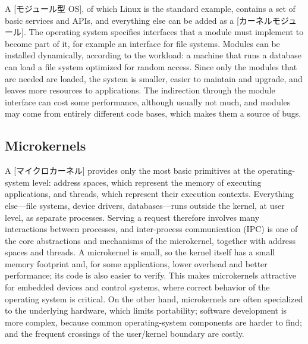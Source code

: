 \documentclass[../main.tex]{subfiles}
\begin{document}
A [モジュール型 OS], of which Linux is the
standard example, contains a set of basic services and APIs, and
everything else can be added as a
[カーネルモジュール].
The operating system specifies interfaces that a module must implement to
become part of it, for example an interface for file systems.  Modules can
be installed dynamically, according to the workload: a machine that runs a
database can load a file system optimized for random access.  Since only
the modules that are needed are loaded, the system is smaller, easier to
maintain and upgrade, and leaves more resources to applications.  The
indirection through the module interface can cost some performance,
although usually not much, and modules may come from entirely different
code bases, which makes them a source of bugs.


\subsection{Microkernels}

A [マイクロカーネル] provides only the most basic
primitives at the operating-system level: address spaces, which represent
the memory of executing applications, and threads, which represent their
execution contexts.  Everything else---file systems, device drivers,
databases---runs outside the kernel, at user level, as separate
processes.
Serving a request therefore involves many interactions between processes,
and inter-process communication (IPC) is one of the core abstractions and
mechanisms of the microkernel, together with address spaces and threads.
A microkernel is small, so the kernel itself has a small memory footprint
and, for some applications, lower overhead and better performance; its
code is also easier to verify.  This
makes microkernels attractive for embedded devices and control systems,
where correct behavior of the operating system is critical.  On the
other hand, microkernels are often specialized to the underlying hardware,
which limits portability; software development is more complex, because
common operating-system components are harder to find; and the frequent
crossings of the user/kernel boundary are costly.
\end{document}
